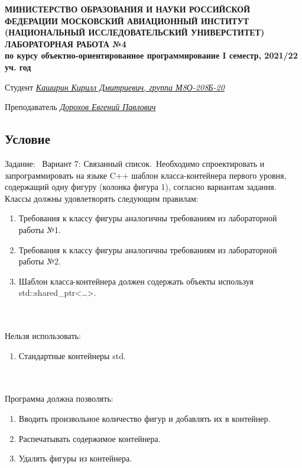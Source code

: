 \documentclass[12pt]{article}
\begin{document}
\begin{titlepage}
\begin{center}
\textbf{МИНИСТЕРСТВО ОБРАЗОВАНИЯ И НАУКИ РОССИЙСКОЙ ФЕДЕРАЦИИ
\medskip
МОСКОВСКИЙ АВИАЦИОННЫЙ ИНСТИТУТ
(НАЦИОНАЛЬНЫЙ ИССЛЕДОВАТЕЛЬСКИЙ УНИВЕРСТИТЕТ)
\vfill\vfill
{\Huge ЛАБОРАТОРНАЯ РАБОТА №4} \\
по курсу объектно-ориентированное программирование
I семестр, 2021/22 уч. год}
\end{center}
\vfill

Студент \uline{\it {Каширин Кирилл Дмитриевич, группа М8О-208Б-20}\hfill}

Преподаватель \uline{\it {Дорохов Евгений Павлович}\hfill}

\vfill
\end{titlepage}

\subsection*{Условие}

Задание: \
Вариант 7: Связанный список.\
Необходимо спроектировать и запрограммировать на языке C++ шаблон класса-контейнера первого уровня, содержащий одну фигуру (колонка фигура 1), согласно вариантам задания. Классы должны удовлетворять следующим правилам:
\begin{enumerate}
\item Требования к классу фигуры аналогичны требованиям из лабораторной работы №1.
\item Требования к классу фигуры аналогичны требованиям из лабораторной работы №2.
\item Шаблон класса-контейнера должен содержать объекты используя std::shared\_ptr<…>.
\end{enumerate}
\\ \\
Нельзя использовать:
\begin{enumerate}
\item Стандартные контейнеры std.
\end{enumerate}
\\ \\
Программа должна позволять:
\begin{enumerate}
\item Вводить произвольное количество фигур и добавлять их в контейнер.
\item Распечатывать содержимое контейнера.
\item Удалять фигуры из контейнера.
\end{enumerate}
\end{document}
